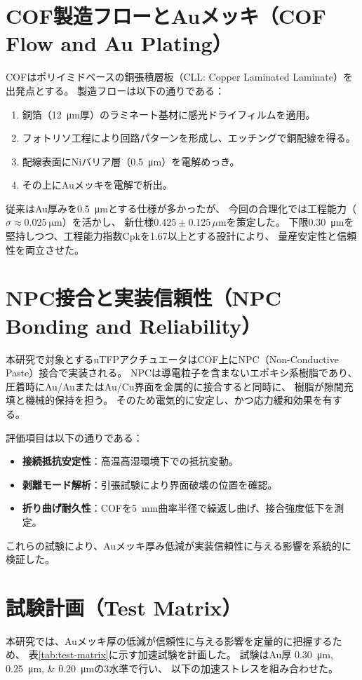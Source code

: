 \documentclass[conference]{IEEEtran}
\begin{document}
\section{COF製造フローとAuメッキ（COF Flow and Au Plating）}
COFはポリイミドベースの銅張積層板（CLL: Copper Laminated Laminate）を出発点とする。
製造フローは以下の通りである：
\begin{enumerate}
  \item 銅箔（\SI{12}{\micro\meter}厚）のラミネート基材に感光ドライフィルムを適用。
  \item フォトリソ工程により回路パターンを形成し、エッチングで銅配線を得る。
  \item 配線表面にNiバリア層（\SI{0.5}{\micro\meter}）を電解めっき。
  \item その上にAuメッキを電解で析出。
\end{enumerate}
従来はAu厚みを\SI{0.5}{\micro\meter}とする仕様が多かったが、
今回の合理化では工程能力（$\sigma \approx \SI{0.025}{\micro\meter}$）を活かし、
新仕様$0.425 \pm 0.125\,\mu$mを策定した。
下限\SI{0.30}{\micro\meter}を堅持しつつ、工程能力指数Cpkを1.67以上とする設計により、
量産安定性と信頼性を両立させた。

\section{NPC接合と実装信頼性（NPC Bonding and Reliability）}
本研究で対象とするuTFPアクチュエータはCOF上にNPC（Non-Conductive Paste）接合で実装される。
NPCは導電粒子を含まないエポキシ系樹脂であり、
圧着時にAu/AuまたはAu/Cu界面を金属的に接合すると同時に、
樹脂が隙間充填と機械的保持を担う。
そのため電気的に安定し、かつ応力緩和効果を有する。

評価項目は以下の通りである：
\begin{itemize}
  \item \textbf{接続抵抗安定性}：高温高湿環境下での抵抗変動。
  \item \textbf{剥離モード解析}：引張試験により界面破壊の位置を確認。
  \item \textbf{折り曲げ耐久性}：COFを\SI{5}{mm}曲率半径で繰返し曲げ、接合強度低下を測定。
\end{itemize}
これらの試験により、Auメッキ厚み低減が実装信頼性に与える影響を系統的に検証した。

\section{試験計画（Test Matrix）}
本研究では、Auメッキ厚の低減が信頼性に与える影響を定量的に把握するため、
表\ref{tab:test-matrix}に示す加速試験を計画した。
試験はAu厚 \SIlist{0.30;0.25;0.20}{\micro\meter}の3水準で行い、
以下の加速ストレスを組み合わせた。
\end{document}
